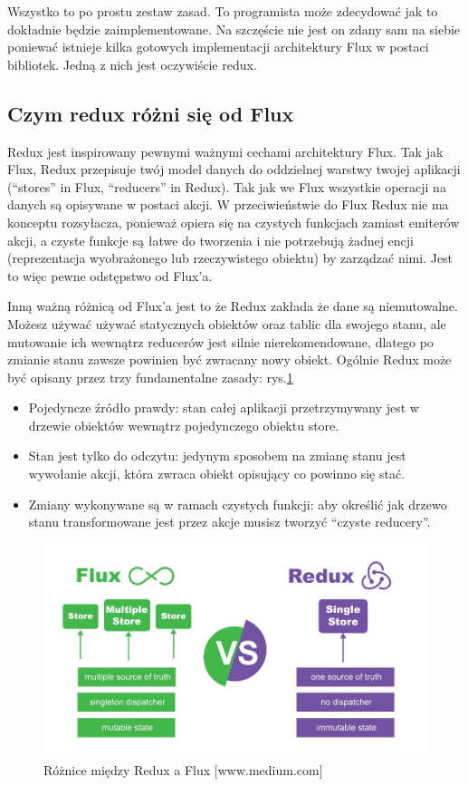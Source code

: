 Wszystko to po prostu zestaw zasad.
To programista może zdecydować jak to dokładnie będzie zaimplementowane.
Na szczęście nie jest on zdany sam na siebie poniewać istnieje kilka gotowych implementacji architektury Flux w postaci bibliotek.\cite{www_nafrontendzie}
Jedną z nich jest oczywiście redux.

\subsection{Czym redux różni się od Flux}

Redux jest inspirowany pewnymi ważnymi cechami architektury Flux.
Tak jak Flux, Redux przepisuje twój model danych do oddzielnej warstwy twojej aplikacji (“stores” in Flux, “reducers” in Redux).
Tak jak we Flux wszystkie operacji na danych są opisywane w postaci akcji.
W przeciwieństwie do Flux Redux nie ma konceptu rozsyłacza,
ponieważ opiera się na czystych funkcjach zamiast emiterów akcji,
a czyste funkcje są łatwe do tworzenia i nie potrzebują żadnej encji (reprezentacja wyobrażonego lub rzeczywistego obiektu) by zarządzać nimi.
Jest to więc pewne odstępstwo od Flux’a.\cite{www_nafrontendzie} 

Inną ważną różnicą od Flux’a jest to że Redux zakłada że dane są niemutowalne.
Możesz używać używać statycznych obiektów oraz tablic dla swojego stanu,
ale mutowanie ich wewnątrz reducerów jest silnie nierekomendowane,
dlatego po zmianie stanu zawsze powinien być zwracany nowy obiekt.
Ogólnie Redux może być opisany przez trzy fundamentalne zasady:
rys.\ref{rys:reduxFlux}
\begin{itemize}
	\item Pojedyncze źródło prawdy: stan całej aplikacji przetrzymywany jest w drzewie obiektów wewnątrz pojedynczego obiektu store.
	\item Stan jest tylko do odczytu: jedynym sposobem na zmianę stanu jest wywołanie akcji, która zwraca obiekt opisujący co powinno się stać.
	\item Zmiany wykonywane są w ramach czystych funkcji: aby określić jak drzewo stanu transformowane jest przez akcje musisz tworzyć “czyste reducery”.
\end{itemize}

\begin{figure}
	\centering\includegraphics[width=.6\textwidth]{img/reduxFlux}
	\caption{Różnice między Redux a Flux [www.medium.com]}\label{rys:reduxFlux}%
\end{figure}


